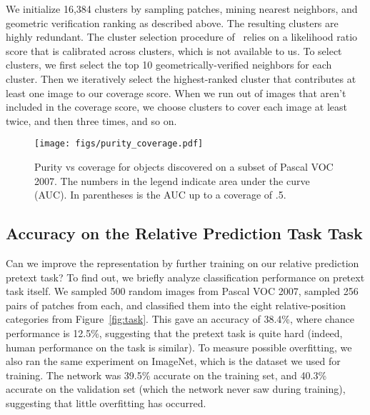 \documentclass[10pt,twocolumn,letterpaper]{article}
\begin{document}
 We initialize 16,384 clusters by sampling patches, mining nearest neighbors, and geometric verification ranking as described above.  The resulting clusters are highly redundant.
The cluster selection procedure of~\cite{doersch2014context} relies on a likelihood ratio score that is calibrated across clusters, which is not available to us.  
To select clusters, we first select the top 10 geometrically-verified neighbors for each cluster.  Then we iteratively select the highest-ranked cluster that contributes at least one image to our coverage score.  When we run out of images that aren't included in the coverage score, we choose clusters to cover each image at least twice, and then three times, and so on.  


\begin{figure}[t]
\begin{center}
   \texttt{[image: figs/purity\_coverage.pdf]}
   \vspace{-.2in}
\end{center}
   \caption{Purity vs coverage for objects discovered on a subset of Pascal VOC 2007. The numbers in the legend indicate area under the curve (AUC). In parentheses is the AUC up to a coverage of .5.}
   \vspace{-.2in}
\label{fig:purcov}
\end{figure}





 








\subsection{Accuracy on the Relative Prediction Task Task}\label{pretext}
Can we improve the representation by further training on our relative prediction pretext task?  To find out, we briefly analyze classification performance on pretext task itself.
We sampled 500 random images from Pascal VOC 2007, sampled 256 pairs of patches from each, and classified them into the eight relative-position categories from Figure~\ref{fig:task}.  This gave an accuracy of 38.4\%, where chance performance is 12.5\%, suggesting that the pretext task is quite hard (indeed, human performance on the task is similar).  
To measure possible overfitting, we also ran the same experiment on ImageNet, which is the dataset we used for training.  The network was 39.5\% accurate on the training set, and 40.3\% accurate on the validation set (which the network never saw during training), suggesting that little overfitting has occurred.
\end{document}
